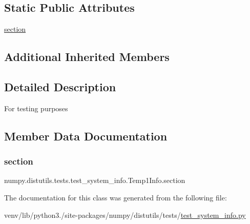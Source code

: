 \subsection*{Static Public Attributes}
\begin{DoxyCompactItemize}
\item 
\hyperlink{classnumpy_1_1distutils_1_1tests_1_1test__system__info_1_1Temp1Info_a8a6b2b48182ed1bd9a71524adb2512c6}{section}
\end{DoxyCompactItemize}
\subsection*{Additional Inherited Members}


\subsection{Detailed Description}
\begin{DoxyVerb}For testing purposes\end{DoxyVerb}
 

\subsection{Member Data Documentation}
\mbox{\label{classnumpy_1_1distutils_1_1tests_1_1test__system__info_1_1Temp1Info_a8a6b2b48182ed1bd9a71524adb2512c6}} 
\subsubsection{\texorpdfstring{section}{section}}
{\footnotesize\ttfamily numpy.\+distutils.\+tests.\+test\+\_\+system\+\_\+info.\+Temp1\+Info.\+section\hspace{0.3cm}{\ttfamily [static]}}



The documentation for this class was generated from the following file\+:\begin{DoxyCompactItemize}
\item 
venv/lib/python3./site-\/packages/numpy/distutils/tests/\hyperlink{test__system__info_8py}{test\+\_\+system\+\_\+info.\+py}\end{DoxyCompactItemize}
